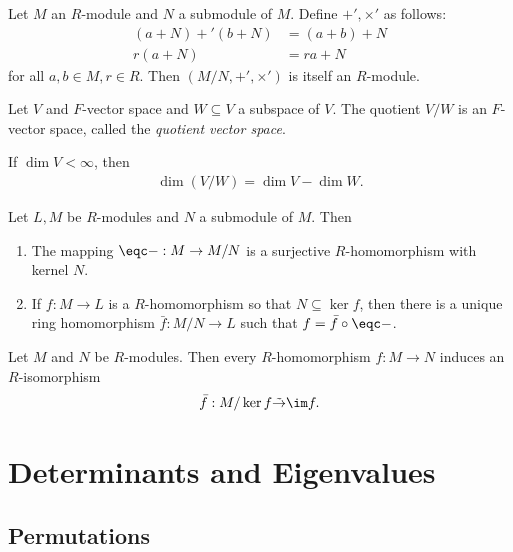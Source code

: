 \documentclass{article}
\begin{document}
\begin{theorem}
	Let $M$ an $R$-module and $N$ a submodule of $M$. Define $+',\times'$ as follows:
	\begin{align*}
		(a+N)+'(b+N) & = (a+b)+N \\
		r(a+N)       & = ra + N
	\end{align*}
	for all $a,b\in M,r\in R$. Then $(M/N,+',\times')$ is itself an $R$-module.
\end{theorem}

\begin{lemma}[Exercise 66]
	Let $V$ and $F$-vector space and $W\subseteq V$ a subspace of $V$. The quotient
	$V/W$ is an $F$-vector space, called the \emph{quotient vector space}.

	If $\dim V<\infty$, then
	\begin{align*}
		\dim (V/W) = \dim V - \dim W.
	\end{align*}
\end{lemma}

\begin{theorem}[Theorem 3.7.32]
	Let $L,M$ be $R$-modules and $N$ a submodule of $M$. Then
	\begin{enumerate}
		\item The mapping $\eqc - : M\to M/N$ is a surjective $R$-homomorphism with kernel $N$.
		\item If $f:M\to L$ is a $R$-homomorphism so that $N\subseteq\ker f$, then there
		      is a unique ring homomorphism $\bar f:M/N\to L$ such that $f=\bar f\circ\eqc -$.
	\end{enumerate}
\end{theorem}

\begin{theorem}
	Let $M$ and $N$ be $R$-modules. Then every $R$-homomorphism $f:M\to N$ induces an $R$-isomorphism
	\begin{align*}
		\bar f:M/\ker f \tilde\to \im f.
	\end{align*}
\end{theorem}

\section{Determinants and Eigenvalues}

\subsection{Permutations}
\end{document}
